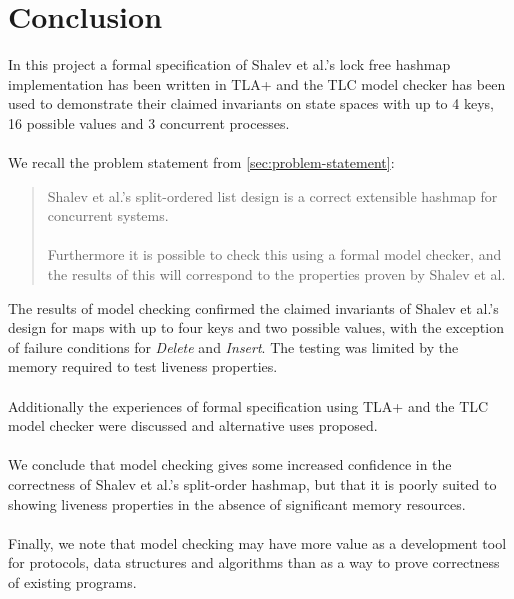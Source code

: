 \documentclass{uit-thesis}
\begin{document}
\section{Conclusion}
In this project a formal specification of Shalev et al.'s lock free hashmap implementation has been written in TLA+ and the TLC model checker has been used to demonstrate their claimed invariants on state spaces with up to 4 keys, 16 possible values and 3 concurrent processes.
\\\\
We recall the problem statement from \autoref{sec:problem-statement}:
\begin{quotation}
    Shalev et al.'s split-ordered list design is a correct extensible hashmap for concurrent systems.
    \\\\
    Furthermore it is possible to check this using a formal model checker, and the results of this will correspond to the properties proven by Shalev et al.
\end{quotation}
The results of model checking confirmed the claimed invariants of Shalev et al.'s design for maps with up to four keys and two possible values, with the exception of failure conditions for \textit{Delete} and \textit{Insert}. The testing was limited by the memory required to test liveness properties.
\\\\
Additionally the experiences of formal specification using TLA+ and the TLC model checker were discussed and alternative uses proposed.
\\\\
We conclude that model checking gives some increased confidence in the correctness of Shalev et al.'s split-order hashmap, but that it is poorly suited to showing liveness properties in the absence of significant memory resources.
\\\\
Finally, we note that model checking may have more value as a development tool for protocols, data structures and algorithms than as a way to prove correctness of existing programs.
\backmatter
\printbibliography{}
\end{document}
